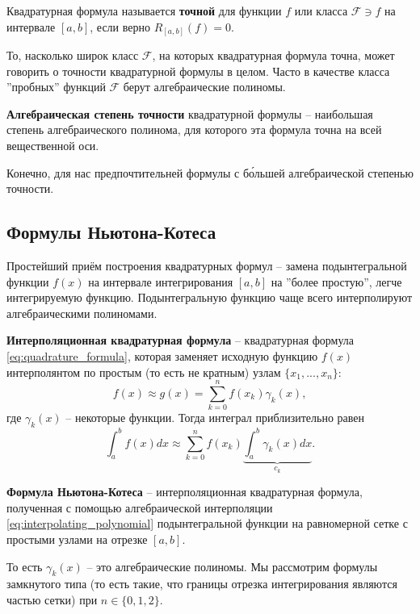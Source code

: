 \documentclass[../main.tex]{subfile}
\begin{document}
\begin{define}
	Квадратурная формула называется \textbf{точной} для функции $f$ или
	класса $\mathcal F\ni f$ на интервале $[a,b]$, если верно $R_{[a,b]}(f)=0$.
\end{define}

То, насколько широк класс $\mathcal F$, на которых квадратурная формула точна,
может говорить о точности квадратурной формулы в целом. Часто в качестве класса
''пробных'' функций $\mathcal F$ берут алгебраические полиномы.

\begin{define}
	\textbf{Алгебраическая степень точности} квадратурной формулы --
	наибольшая степень алгебраического полинома, для которого эта формула
	точна на всей вещественной оси.
\end{define}

Конечно, для нас предпочтительней формулы с б\'{о}льшей алгебраической степенью
точности.

\subsection{Формулы Ньютона-Котеса}
Простейший приём построения квадратурных формул -- замена подынтегральной
функции $f(x)$ на интервале интегрирования $[a,b]$ на ''более простую'',
легче интегрируемую функцию. Подынтегральную функцию чаще всего интерполируют
алгебраическими полиномами.\newpage

\begin{define}
	\textbf{Интерполяционная квадратурная формула} -- квадратурная формула
	\eqref{eq:quadrature_formula}, которая заменяет исходную функцию $f(x)$
	интерполянтом по простым (то есть не кратным) узлам $\{x_1,...,x_n\}$:
	\[f(x)\approx g(x)=\sum_{k=0}^{n}f(x_k)\gamma_k(x),\]
	где $\gamma_k(x)$ -- некоторые функции. Тогда интеграл приблизительно
	равен
	\[\int_{a}^{b}f(x)dx\approx\sum_{k=0}^{n}f(x_k)
	\underset{c_k}{\underbrace{\int_{a}^{b}\gamma_k(x)dx}}.\]
\end{define}

\begin{define}\label{eq:newton_cotes_formula}
	\textbf{Формула Ньютона-Котеса} -- интерполяционная квадратурная
	формула, полученная с помощью алгебраической интерполяции
	\eqref{eq:interpolating_polynomial} подынтегральной функции на
	равномерной сетке с простыми узлами на отрезке $[a,b]$.
\end{define}

То есть $\gamma_k(x)$ -- это алгебраические полиномы. Мы рассмотрим формулы
замкнутого типа (то есть такие, что границы отрезка интегрирования являются
частью сетки) при $n\in\{0,1,2\}$.
\end{document}

